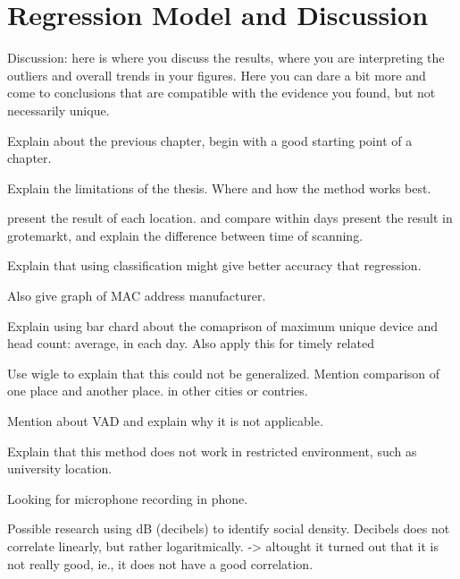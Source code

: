 \chapter{Regression Model and Discussion}
\label{ch:model-and-discussion} %
Discussion: here is where you discuss the results, where you are interpreting the outliers and overall trends in your figures. Here you can dare a bit more and come to conclusions that are compatible with the evidence you found, but not necessarily unique. 

Explain about the previous chapter, begin with a good starting point of a chapter.

Explain the limitations of the thesis. Where and how the method works best.

present the result of each location. and compare within days
present the result in grotemarkt, and explain the difference between time of scanning.

Explain that using classification might give better accuracy that regression.

Also give graph of MAC address manufacturer.

Explain using bar chard about the comaprison of maximum unique device and head count: average, in each day. Also apply this for timely related 

Use wigle to explain that this could not be generalized. Mention comparison of one place and another place. in other cities or contries.

Mention about VAD and explain why it is not applicable.

Explain that this method does not work in restricted environment, such as university location.

Looking for microphone recording in phone.

Possible research using dB (decibels) to identify social density.
Decibels does not correlate linearly, but rather logaritmically. -> altought it turned out that it is not really good, ie., it does not have a good correlation.


